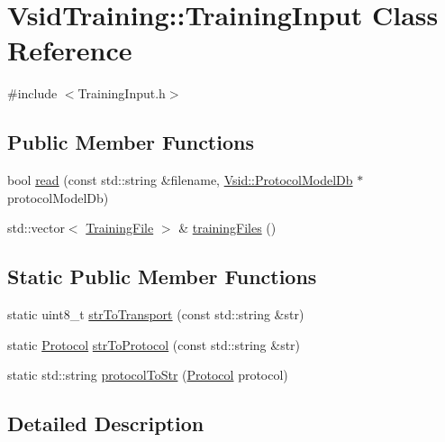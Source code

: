 \hypertarget{class_vsid_training_1_1_training_input}{\section{Vsid\-Training\-:\-:Training\-Input Class Reference}
\label{class_vsid_training_1_1_training_input}
}


{\ttfamily \#include $<$Training\-Input.\-h$>$}

\subsection*{Public Member Functions}
\begin{DoxyCompactItemize}
\item 
bool \hyperlink{class_vsid_training_1_1_training_input_aa62c31bea8a9151cda5bdfadd8aa6d96}{read} (const std\-::string \&filename, \hyperlink{class_vsid_1_1_protocol_model_db}{Vsid\-::\-Protocol\-Model\-Db} $\ast$protocol\-Model\-Db)
\item 
std\-::vector$<$ \hyperlink{class_vsid_training_1_1_training_file}{Training\-File} $>$ \& \hyperlink{class_vsid_training_1_1_training_input_a808d2ab081b175e4ea0490995fed4493}{training\-Files} ()
\end{DoxyCompactItemize}
\subsection*{Static Public Member Functions}
\begin{DoxyCompactItemize}
\item 
static uint8\-\_\-t \hyperlink{class_vsid_training_1_1_training_input_a44bef3969896dadbdb2df4a7af7b1ab2}{str\-To\-Transport} (const std\-::string \&str)
\item 
static \hyperlink{namespace_vsid_training_a3bd76b3dc03035a8bde253556505b46a}{Protocol} \hyperlink{class_vsid_training_1_1_training_input_adb57feb04abb6a43a8ef3a7bc2afadd3}{str\-To\-Protocol} (const std\-::string \&str)
\item 
static std\-::string \hyperlink{class_vsid_training_1_1_training_input_a3c6a3653fe271f5fa2bee927374434ee}{protocol\-To\-Str} (\hyperlink{namespace_vsid_training_a3bd76b3dc03035a8bde253556505b46a}{Protocol} protocol)
\end{DoxyCompactItemize}


\subsection{Detailed Description}



